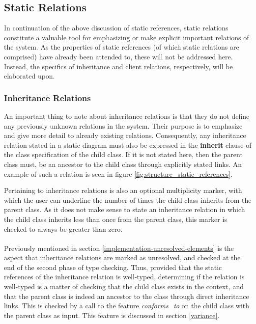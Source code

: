 \subsection{Static Relations}
In continuation of the above discussion of static references, static relations constitute a valuable tool for emphasizing or make explicit important relations of the system. As the properties of static references (of which static relations are comprised) have already been attended to, these will not be addressed here. Instead, the specifics of inheritance and client relations, respectively, will be elaborated upon.
\subsubsection{Inheritance Relations}
An important thing to note about inheritance relations is that they do not define any previously unknown relations in the system. Their purpose is to emphasize and give more detail to already existing relations. Consequently, any inheritance relation stated in a static diagram must also be expressed in the \textbf{inherit} clause of the class specification of the child class. If it is not stated here, then the parent class must, be an ancestor to the child class through explicitly stated links. An example of such a relation is seen in figure \ref{fig:structure_static_references}.

Pertaining to inheritance relations is also an optional multiplicity marker, with which the user can underline the number of times the child class inherits from the parent class. As it does not make sense to state an inheritance relation in which the child class inherits less than once from the parent class, this marker is checked to always be greater than zero.
\paragraph{}
Previously mentioned in section \ref{implementation-unresolved-elements} is the aspect that inheritance relations are marked as unresolved, and checked at the end of the second phase of type checking. Thus, provided that the static references of the inheritance relation is well-typed, determining if the relation is well-typed is a matter of checking that the child class exists in the context, and that the parent class is indeed an ancestor to the class through direct inheritance links. This is checked by a call to the feature \textit{conforms\_to} on the child class with the parent class as input. This feature is discussed in section \ref{variance}. 
